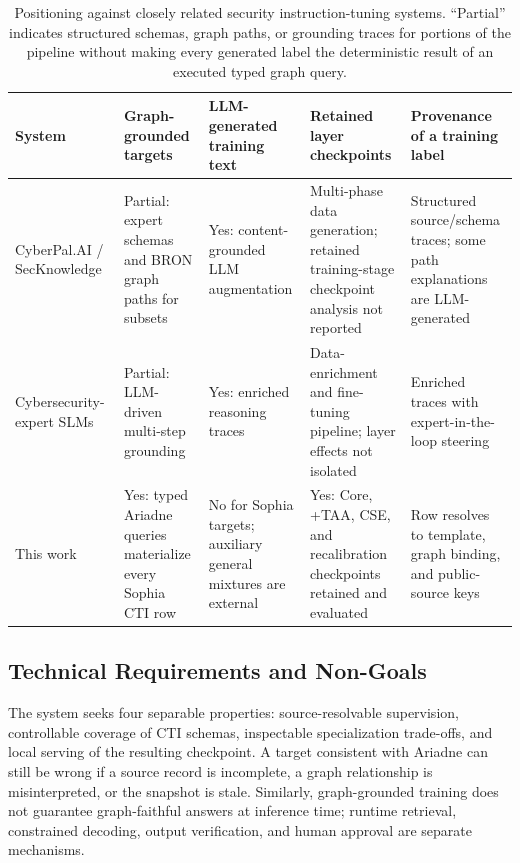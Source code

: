 \documentclass[conference]{IEEEtran}
\begin{document}
\begin{table}[t]
\caption{Positioning against closely related security instruction-tuning systems. ``Partial'' indicates structured schemas, graph paths, or grounding traces for portions of the pipeline without making every generated label the deterministic result of an executed typed graph query.}
\label{tab:related}
\centering
\scriptsize
\setlength{\tabcolsep}{3pt}
\begin{tabular}{@{}p{}p{}p{}p{}p{}@{}}
\toprule
System & Graph-grounded targets & LLM-generated training text & Retained layer checkpoints & Provenance of a training label \\
\midrule
CyberPal.AI / SecKnowledge~\cite{levi2025cyberpal} & Partial: expert schemas and BRON graph paths for subsets & Yes: content-grounded LLM augmentation & Multi-phase data generation; retained training-stage checkpoint analysis not reported & Structured source/schema traces; some path explanations are LLM-generated \\
Cybersecurity-expert SLMs~\cite{levi2025slm} & Partial: LLM-driven multi-step grounding & Yes: enriched reasoning traces & Data-enrichment and fine-tuning pipeline; layer effects not isolated & Enriched traces with expert-in-the-loop steering \\
This work & Yes: typed Ariadne queries materialize every Sophia CTI row & No for Sophia targets; auxiliary general mixtures are external & Yes: Core, +TAA, CSE, and recalibration checkpoints retained and evaluated & Row resolves to template, graph binding, and public-source keys \\
\bottomrule
\end{tabular}
\end{table}

\subsection{Technical Requirements and Non-Goals}
The system seeks four separable properties: source-resolvable supervision, controllable coverage of CTI schemas, inspectable specialization trade-offs, and local serving of the resulting checkpoint. A target consistent with Ariadne can still be wrong if a source record is incomplete, a graph relationship is misinterpreted, or the snapshot is stale. Similarly, graph-grounded training does not guarantee graph-faithful answers at inference time; runtime retrieval, constrained decoding, output verification, and human approval are separate mechanisms.
\end{document}
